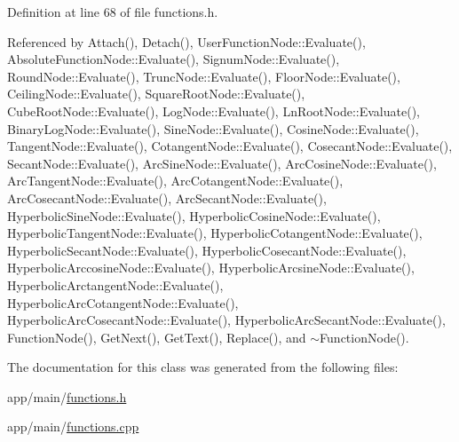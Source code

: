 Definition at line 68 of file functions.\+h.



Referenced by Attach(), Detach(), User\+Function\+Node\+::\+Evaluate(), Absolute\+Function\+Node\+::\+Evaluate(), Signum\+Node\+::\+Evaluate(), Round\+Node\+::\+Evaluate(), Trunc\+Node\+::\+Evaluate(), Floor\+Node\+::\+Evaluate(), Ceiling\+Node\+::\+Evaluate(), Square\+Root\+Node\+::\+Evaluate(), Cube\+Root\+Node\+::\+Evaluate(), Log\+Node\+::\+Evaluate(), Ln\+Root\+Node\+::\+Evaluate(), Binary\+Log\+Node\+::\+Evaluate(), Sine\+Node\+::\+Evaluate(), Cosine\+Node\+::\+Evaluate(), Tangent\+Node\+::\+Evaluate(), Cotangent\+Node\+::\+Evaluate(), Cosecant\+Node\+::\+Evaluate(), Secant\+Node\+::\+Evaluate(), Arc\+Sine\+Node\+::\+Evaluate(), Arc\+Cosine\+Node\+::\+Evaluate(), Arc\+Tangent\+Node\+::\+Evaluate(), Arc\+Cotangent\+Node\+::\+Evaluate(), Arc\+Cosecant\+Node\+::\+Evaluate(), Arc\+Secant\+Node\+::\+Evaluate(), Hyperbolic\+Sine\+Node\+::\+Evaluate(), Hyperbolic\+Cosine\+Node\+::\+Evaluate(), Hyperbolic\+Tangent\+Node\+::\+Evaluate(), Hyperbolic\+Cotangent\+Node\+::\+Evaluate(), Hyperbolic\+Secant\+Node\+::\+Evaluate(), Hyperbolic\+Cosecant\+Node\+::\+Evaluate(), Hyperbolic\+Arccosine\+Node\+::\+Evaluate(), Hyperbolic\+Arcsine\+Node\+::\+Evaluate(), Hyperbolic\+Arctangent\+Node\+::\+Evaluate(), Hyperbolic\+Arc\+Cotangent\+Node\+::\+Evaluate(), Hyperbolic\+Arc\+Cosecant\+Node\+::\+Evaluate(), Hyperbolic\+Arc\+Secant\+Node\+::\+Evaluate(), Function\+Node(), Get\+Next(), Get\+Text(), Replace(), and $\sim$\+Function\+Node().



The documentation for this class was generated from the following files\+:\begin{DoxyCompactItemize}
\item 
app/main/\hyperlink{functions_8h}{functions.\+h}\item 
app/main/\hyperlink{functions_8cpp}{functions.\+cpp}\end{DoxyCompactItemize}
